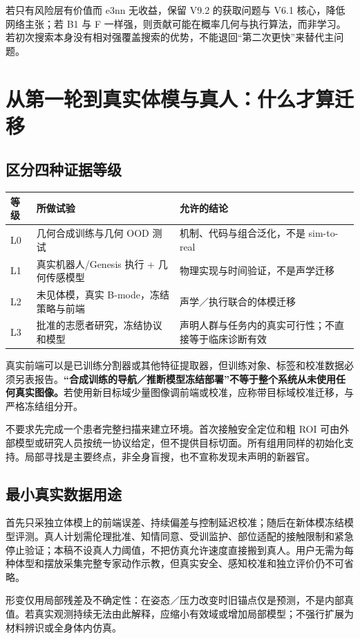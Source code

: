 \documentclass[UTF8,fontset=fandol,11pt,a4paper]{ctexart}
\theoremstyle{plain}
\theoremstyle{definition}
\theoremstyle{remark}
\numberwithin{equation}{section}
\begin{document}
若只有风险层有价值而 e3nn 无收益，保留 V9.2 的获取问题与 V6.1 核心，降低网络主张；若 B1 与 F 一样强，则贡献可能在概率几何与执行算法，而非学习。若初次搜索本身没有相对强覆盖搜索的优势，不能退回“第二次更快”来替代主问题。

\section{从第一轮到真实体模与真人：什么才算迁移}
\label{sec:real}
\subsection{区分四种证据等级}
\begin{table}[htbp]\centering\small
\begin{tabularx}{\linewidth}{P{25mm}YY}\toprule
等级 & 所做试验 & 允许的结论\\\midrule
L0 & 几何合成训练与几何 OOD 测试 & 机制、代码与组合泛化，不是 sim-to-real\\
L1 & 真实机器人/Genesis 执行 + 几何传感模型 & 物理实现与时间验证，不是声学迁移\\
L2 & 未见体模，真实 B-mode，冻结策略与前端 & 声学／执行联合的体模迁移\\
L3 & 批准的志愿者研究，冻结协议和模型 & 声明人群与任务内的真实可行性；不直接等于临床诊断有效\\\bottomrule
\end{tabularx}
\end{table}
真实前端可以是已训练分割器或其他特征提取器，但训练对象、标签和校准数据必须另表报告。\textbf{“合成训练的导航／推断模型冻结部署”不等于整个系统从未使用任何真实图像。}若使用新目标域少量图像调前端或校准，应称带目标域校准迁移，与严格冻结组分开。

不要求先完成一个患者完整扫描来建立环境。首次接触安全定位和粗 ROI 可由外部模型或研究人员按统一协议给定，但不提供目标切面。所有组用同样的初始化支持。局部寻找是主要终点，非全身盲搜，也不宣称发现未声明的新器官。

\subsection{最小真实数据用途}
首先只采独立体模上的前端误差、持续偏差与控制延迟校准；随后在新体模冻结模型评测。真人计划需伦理批准、知情同意、受训监护、部位适配的接触限制和紧急停止验证；本稿不设真人力阈值，不把仿真允许速度直接搬到真人。用户无需为每种体型和摆放采集完整专家动作示教，但真实安全、感知校准和独立评价仍不可省略。

形变仅用局部残差及不确定性：在姿态／压力改变时旧锚点仅是预测，不是内部真值。若真实观测持续无法由此解释，应缩小有效域或增加局部模型；不强行扩展为材料辨识或全身体内仿真。
\end{document}
